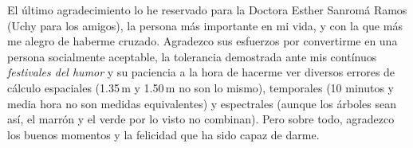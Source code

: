 El último agradecimiento lo he reservado para la Doctora Esther Sanromá Ramos (Uchy para los amigos), la persona más importante en mi vida, y con la que más me alegro de haberme cruzado. Agradezco sus esfuerzos por convertirme en una persona socialmente aceptable, la tolerancia demostrada ante mis contínuos \emph{festivales del humor} y su paciencia a la hora de hacerme ver diversos errores de cálculo espaciales (1.35\,m y 1.50\,m no son lo mismo), temporales (10 minutos y media hora no son medidas equivalentes) y espectrales (aunque los árboles sean así, el marrón y el verde por lo visto no combinan). Pero sobre todo, agradezco los buenos momentos y la felicidad que ha sido capaz de darme.








